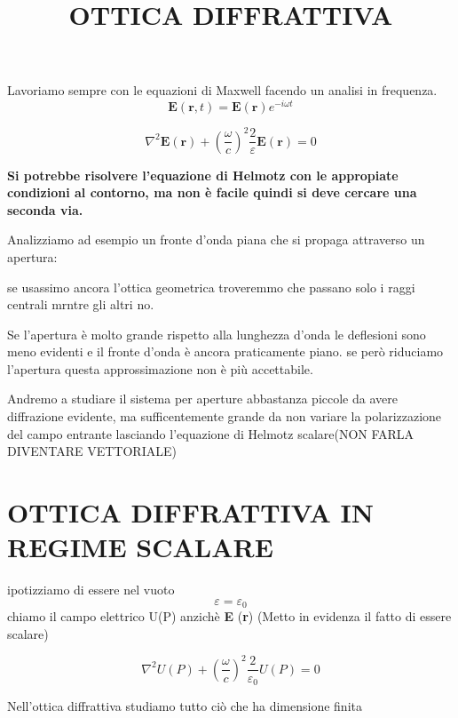 \documentclass{article}
\begin{document}
\title{OTTICA DIFFRATTIVA}

Lavoriamo sempre con le equazioni di Maxwell facendo un analisi in frequenza.
\begin{equation}
\textbf{E}(\textbf{r}, t)= \textbf{E}( \textbf{r} ) e^{-i \omega t}
\end{equation}

\begin{equation}
\nabla ^{2}\textbf{E} (\textbf{r}) + (\frac{\omega}{c})^{2}\frac{2}{\varepsilon}\textbf{E} (\textbf{r})=0
\end{equation}

\textbf{Si potrebbe risolvere l'equazione di Helmotz con le appropiate condizioni al contorno, ma non è facile quindi si deve cercare una seconda via.}

Analizziamo ad esempio un fronte d'onda piana che si propaga attraverso un apertura:

 se usassimo ancora l'ottica geometrica troveremmo che passano solo i raggi centrali mrntre gli altri no.


Se l'apertura è molto grande rispetto alla lunghezza d'onda le deflesioni sono meno evidenti e il fronte d'onda è ancora praticamente piano. se però riduciamo l'apertura questa approssimazione non è più accettabile.

Andremo a studiare il sistema per aperture abbastanza piccole da avere diffrazione evidente, ma sufficentemente grande da non variare la polarizzazione del campo entrante lasciando l'equazione di Helmotz scalare(NON FARLA DIVENTARE VETTORIALE)

\section{OTTICA DIFFRATTIVA IN REGIME SCALARE}

ipotizziamo di essere nel vuoto 
\begin{equation}
\varepsilon = \varepsilon 	_{0}
\end{equation}
chiamo il campo elettrico U(P) anzichè \textbf{E} (\textbf{r}) 		(Metto in evidenza il fatto di essere scalare)

\begin{equation}
\nabla ^{2}U(P) + (\frac{\omega}{c})^{2}\frac{2}{\varepsilon _{0}}U(P)=0
\end{equation}

Nell'ottica diffrattiva studiamo tutto ciò che ha dimensione finita 


\end{document}
